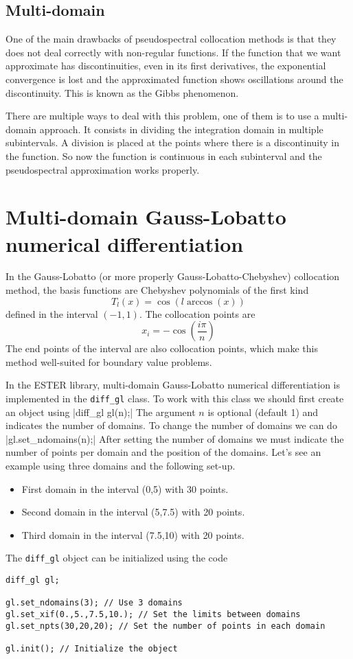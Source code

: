 \subsection{Multi-domain}

One of the main drawbacks of pseudospectral collocation methods is that they does not deal correctly
with non-regular functions. If the function that we want approximate has discontinuities, even in its
first derivatives, the exponential convergence is lost and the approximated function shows oscillations
around the discontinuity. This is known as the Gibbs phenomenon. 

There are multiple ways to deal with this problem, one of them is to use a multi-domain approach. 
It consists in dividing the integration domain in multiple subintervals. A division is placed at
the points where there is a discontinuity in the function. So now the function is continuous
in each subinterval and the pseudospectral approximation works properly.

\section{Multi-domain Gauss-Lobatto numerical differentiation}

In the Gauss-Lobatto (or more properly Gauss-Lobatto-Chebyshev) collocation method, the basis functions
are Chebyshev polynomials of the first kind
$$T_l(x)=\cos(l\arccos(x))$$
defined in the interval $(-1,1)$. The collocation points are
$$x_i=-\cos(\frac{i\pi}{n})$$
The end points of the interval are also collocation points, which make this method
well-suited for boundary value problems.

In the ESTER library, multi-domain Gauss-Lobatto numerical differentiation is implemented in the
\verb|diff_gl| class. To work with this class we should first create an object using
|diff_gl gl(n);|
The argument $n$ is optional (default 1) and indicates the number of domains. To change the number
of domains we can do
|gl.set_ndomains(n);|
After setting the number of domains we must indicate the number of points per domain and the position
of the domains. Let's see an example using three domains and the following set-up.
\begin{itemize}
\item First domain in the interval (0,5) with 30 points.
\item Second domain in the interval (5,7.5) with 20 points.
\item Third domain in the interval (7.5,10) with 20 points.
\end{itemize}
The \verb|diff_gl| object can be initialized using the code
\begin{verbatim}
diff_gl gl;

gl.set_ndomains(3); // Use 3 domains
gl.set_xif(0.,5.,7.5,10.); // Set the limits between domains
gl.set_npts(30,20,20); // Set the number of points in each domain

gl.init(); // Initialize the object

\end{verbatim}


